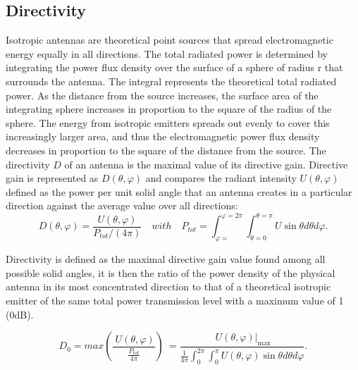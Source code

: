 \subsection{Directivity}

Isotropic antennas are theoretical point sources that spread electromagnetic energy equally in all directions. The total radiated power is determined by integrating the power flux density over the surface of a sphere of radius r that surrounds the antenna. The integral represents the theoretical total radiated power. As the distance from the source increases, the surface area of the integrating sphere increases in proportion to the square of the radius of the sphere. The energy from isotropic emitters spreads out evenly to cover this increasingly larger area, and thus the electromagnetic power flux density decreases in proportion to the square of the distance from the source.
The directivity  $D$  of an antenna is the maximal value of its directive gain. Directive gain is represented as  $D \left(  \theta , \varphi  \right)$  and compares the radiant intensity  $U \left(  \theta , \varphi  \right)$  defined as the power per unit solid angle that an antenna creates in a particular direction against the average value over all directions:
\begin{equation}
D \left(  \theta , \varphi  \right) = \frac{ U \left(  \theta , \varphi  \right) }{P_{tot}/ \left( 4 \pi  \right) } \quad  with \quad  P_{tot}= \int_{ \varphi =}^{ \varphi =2 \pi } \int_{ \theta =0}^{ \theta = \pi }U\sin  \theta d \theta d \varphi.
\label{directivity}
\end{equation}

Directivity is defined as the maximal directive gain value found among all possible solid angles, it is then the ratio of the power density of the physical antenna in its most concentrated direction to that of a theoretical isotropic emitter of the same total power transmission level with a maximum value of 1 (0dB).

\begin{equation}
D_{0}=max \left( \frac{~U \left(  \theta , \varphi  \right) }{\frac{P_{tot}}{4 \pi }} \right) ~=\frac{~  U \left(  \theta , \varphi  \right)  \vert_{\max }}{\frac{1}{4 \pi } \int_{0}^{2 \pi } \int _{0}^{ \pi }U \left(  \theta , \varphi  \right) \sin  \theta d \theta d \varphi }.
\end{equation}





